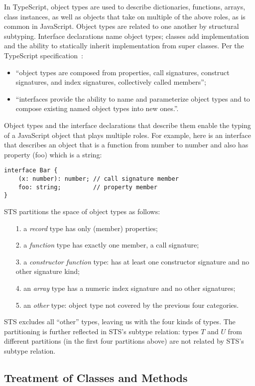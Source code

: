 In TypeScript, object types are used to describe dictionaries, functions, arrays, class instances,
as well as objects that take on multiple of the above roles, as is common in JavaScript. Object types are
related to one another by structural subtyping.  Interface declarations name object types; classes add implementation
and the ability to statically inherit implementation from super classes. Per the TypeScript specification~\cite{TSspec2016}:
\begin{itemize}
\item ``object types are composed from properties, call signatures, construct signatures, and index signatures, collectively called members'';
\item ``interfaces provide the ability to name and parameterize object types and to compose existing named object types into new ones.''.
\end{itemize}
Object types and the interface declarations that describe them enable the typing of a JavaScript object that plays multiple roles.
For example, here is an interface that describes an object that is a function from number to number
and also has property (foo) which is a string:
\begin{lstlisting}
interface Bar {
    (x: number): number; // call signature member
    foo: string;         // property member
}
\end{lstlisting}
STS partitions the space of object types as follows:
\begin{itemize}
\item[1.] a \emph{record} type has only (member) properties;
\item[2.] a \emph{function} type has exactly one member, a call signature;
\item[3.] a \emph{constructor function} type: has at least one constructor signature and no other signature kind;
\item[4.] an \emph{array} type has a numeric index signature and no other signatures;
\item[5.] an \emph{other} type: object type not covered by the previous four categories.
\end{itemize}
STS excludes all ``other'' types, leaving us with the four kinds of types.
The partitioning is further reflected in STS's subtype relation:
types $T$ and $U$ from different partitions (in the first four partitions above)
are not related by STS's subtype relation.

\subsection{Treatment of Classes and Methods}


